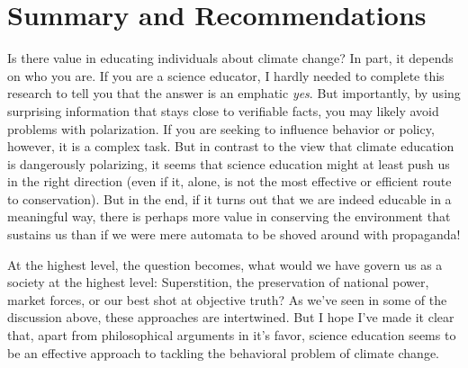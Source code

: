 
\section{Summary and Recommendations}

Is there value in educating individuals about climate change? In part, it
depends on who you are. If you are a science educator, I hardly needed to
complete this research to tell you that the answer is an emphatic \emph{yes}.
But importantly, by using surprising information that stays close to verifiable
facts, you may likely avoid problems with polarization. If you are seeking to
influence behavior or policy, however, it is a complex task.  But in contrast to
the view that climate education is dangerously polarizing, it seems that science
education might at least push us in the right direction (even if it, alone, is
not the most effective or efficient route to conservation). But in the end, if
it turns out that we are indeed educable in a meaningful way, there is perhaps
more value in conserving the environment that sustains us than if we were mere
automata to be shoved around with propaganda!


At the highest level, the question becomes, what would we have govern us as a
society at the highest level: Superstition, the preservation of national power,
market forces, or our best shot at objective truth? As we've seen in some of the
discussion above, these approaches are intertwined. But I hope I've made it
clear that, apart from philosophical arguments in it's favor, science education
seems to be an effective approach to tackling the behavioral problem of climate
change.
